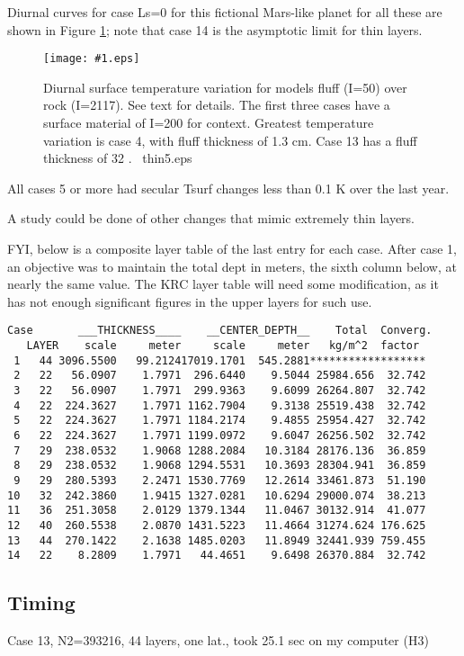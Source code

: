 \documentclass{article}  %
\newcommand{\igc}[1]{\texttt{[image: \#1.eps]}}  %
\begin{document}
Diurnal curves for case Ls=0 for this fictional Mars-like planet for all these
are shown in Figure \ref{thin5}; note that case 14 is the asymptotic
limit for thin layers.

\begin{figure}[!ht] \igc{thin5}
\caption[Thin surface layer]{Diurnal surface temperature variation for models
  fluff (I=50) over rock (I=2117). See text for details. The first three cases
  have a surface material of I=200 for context. Greatest temperature variation
  is case 4, with fluff thickness of 1.3 cm. Case 13 has a fluff thickness of 32
  \um.  \ thin5.eps \label{thin5} } \end{figure}

All cases 5 or more had secular Tsurf changes less than 0.1 K over the last year.

A study could be done of other changes that mimic extremely thin layers.

\newpage
FYI, below is a composite layer table of the last entry for each case. After
case 1, an objective was to maintain the total dept in meters, the sixth column
below, at nearly the same value. The KRC layer table will need some
modification, as it has not enough significant figures in the upper layers for
such use.

\begin{verbatim}
Case       ___THICKNESS____    __CENTER_DEPTH__    Total  Converg.
   LAYER    scale     meter     scale     meter   kg/m^2  factor
 1   44 3096.5500   99.212417019.1701  545.2881******************
 2   22   56.0907    1.7971  296.6440    9.5044 25984.656  32.742
 3   22   56.0907    1.7971  299.9363    9.6099 26264.807  32.742
 4   22  224.3627    1.7971 1162.7904    9.3138 25519.438  32.742
 5   22  224.3627    1.7971 1184.2174    9.4855 25954.427  32.742
 6   22  224.3627    1.7971 1199.0972    9.6047 26256.502  32.742
 7   29  238.0532    1.9068 1288.2084   10.3184 28176.136  36.859
 8   29  238.0532    1.9068 1294.5531   10.3693 28304.941  36.859
 9   29  280.5393    2.2471 1530.7769   12.2614 33461.873  51.190
10   32  242.3860    1.9415 1327.0281   10.6294 29000.074  38.213
11   36  251.3058    2.0129 1379.1344   11.0467 30132.914  41.077
12   40  260.5538    2.0870 1431.5223   11.4664 31274.624 176.625
13   44  270.1422    2.1638 1485.0203   11.8949 32441.939 759.455
14   22    8.2809    1.7971   44.4651    9.6498 26370.884  32.742
\end{verbatim}

\subsection{Timing} %
Case 13, N2=393216, 44 layers, one lat., took 25.1 sec on my computer (H3)
\end{document}
